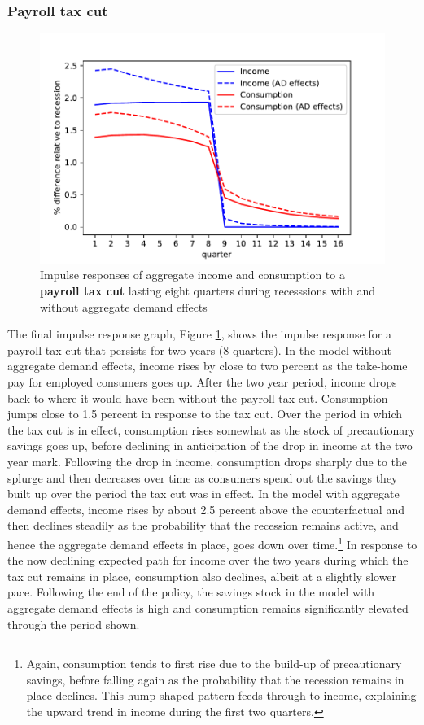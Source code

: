 \documentclass[../HAFiscal]{subfiles}
\begin{document}
\subsubsection{Payroll tax cut}

\begin{figure}
	\centering
	\includegraphics[width=0.8\linewidth]{Code/HA-Models/FromPandemicCode/Figures/recession_taxcut_relrecession}
	\caption{Impulse responses of aggregate income and consumption to a \textbf{payroll tax cut} lasting eight quarters during recesssions with and without aggregate demand effects}
	\label{fig:recessiontaxcutrelrecession}
\end{figure}

The final impulse response graph, Figure \ref{fig:recessiontaxcutrelrecession}, shows the impulse response for a payroll tax cut that persists for two years (8 quarters). In the model without aggregate demand effects, income rises by close to two percent as the take-home pay for employed consumers goes up. After the two year period, income drops back to where it would have been without the payroll tax cut. Consumption jumps close to 1.5 percent in response to the tax cut. Over the period in which the tax cut is in effect, consumption rises somewhat as the stock of precautionary savings goes up, before declining in anticipation of the drop in income at the two year mark. Following the drop in income, consumption drops sharply due to the splurge and then decreases over time as consumers spend out the savings they built up over the period the tax cut was in effect. In the model with aggregate demand effects, income rises by about 2.5 percent above the counterfactual and then declines steadily as the probability that the recession remains active, and hence the aggregate demand effects in place, goes down over time.\footnote{Again, consumption tends to first rise due to the build-up of precautionary savings, before falling again as the probability that the recession remains in place declines. This hump-shaped pattern feeds through to income, explaining the upward trend in income during the first two quarters.} In response to the now declining expected path for income over the two years during which the tax cut remains in place, consumption also declines, albeit at a slightly slower pace. Following the end of the policy, the savings stock in the model with aggregate demand effects is high and consumption remains significantly elevated through the period shown.
\end{document}
